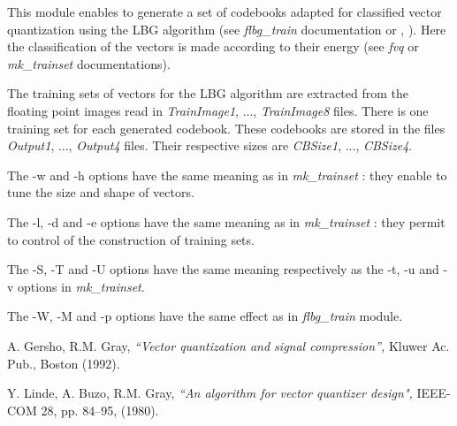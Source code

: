 This module enables to generate a set of codebooks adapted for classified 
vector quantization using the LBG algorithm 
(see {\em flbg\_train} documentation or \cite{kn:gg}, \cite{kn:lbg}). 
Here the classification of the vectors is made according to their energy 
(see {\em fvq} or {\em mk\_trainset} documentations). 

The training sets of vectors for the LBG algorithm are extracted from 
the floating point images read in {\em TrainImage1}, ..., {\em TrainImage8} 
files. There is one training set for each generated codebook. 
These codebooks are stored in the files {\em Output1}, ..., {\em Output4} 
files. Their respective sizes are {\em CBSize1}, ..., {\em CBSize4}. 

The -w and -h options have the same meaning as in {\em mk\_trainset} : 
they enable to tune the size and shape of vectors. 

The -l, -d and -e options have the same meaning as in {\em mk\_trainset} : 
they permit to control of the construction of training sets. 

The -S, -T and -U options have the same meaning respectively as the -t, -u 
and -v options in {\em mk\_trainset}.  

The -W, -M and -p options have the same effect as in {\em flbg\_train} 
module. 


\begin{thebibliography}{999999}

 A. Gersho, R.M. Gray, {\em ``Vector quantization 
and signal compression'', } Kluwer Ac. Pub., Boston (1992). 

 Y. Linde, A. Buzo, R.M. Gray, {\em ``An algorithm for 
vector quantizer design", } IEEE-COM 28, pp. 84--95, (1980).

\end{thebibliography}
